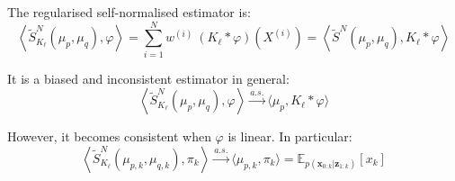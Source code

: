 \begin{proposition}\label{th:KDE}
	The regularised self-normalised estimator is:
	\begin{equation}
		\left\langle\tilde{S}_{K_\ell}^N(\mu_p,\mu_q),\varphi\right\rangle=\sum_{i=1}^Nw^{(i)}\:\left(K_\ell*\varphi\right)\left(X^{(i)}\right)=\left\langle\tilde{S}^N(\mu_p,\mu_q),K_\ell*\varphi\right\rangle
	\end{equation}

	It is a biased and inconsistent estimator in general:
	\begin{equation}
		\left\langle\tilde{S}_{K_\ell}^N(\mu_p,\mu_q),\varphi\right\rangle\overset{a.s.}{\longrightarrow}\langle\mu_p,K_\ell*\varphi\rangle
	\end{equation}

	However, it becomes consistent when $\varphi$ is linear. In particular:
	\begin{equation}
		\left\langle\tilde{S}_{K_\ell}^N(\mu_{p,k},\mu_{q,k}),\pi_k\right\rangle\overset{a.s.}{\longrightarrow}\langle\mu_{p,k},\pi_k\rangle=\mathbb{E}_{p(\mathbf{x}_{0:k}|\mathbf{z}_{1:k})}[x_k]
	\end{equation}
\end{proposition}

